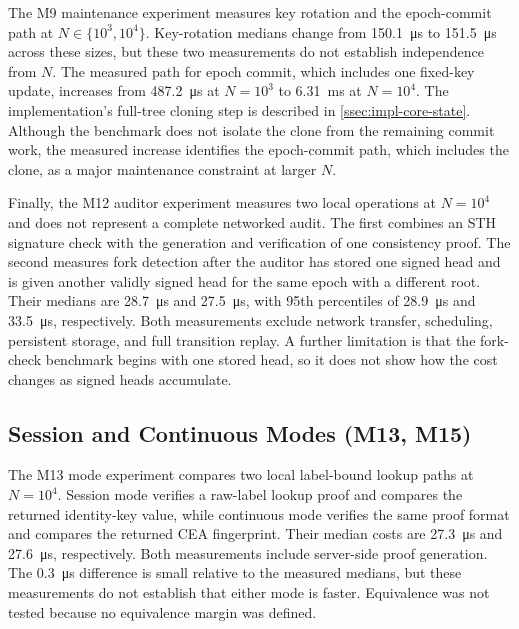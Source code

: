 The M9 maintenance experiment measures key rotation and the epoch-commit path at
$N\in\{10^3,10^4\}$. Key-rotation medians change from \SI{150.1}{\micro\second} to
\SI{151.5}{\micro\second} across these sizes, but these two measurements do not establish
independence from $N$. The measured path for epoch commit, which includes one fixed-key update,
increases from \SI{487.2}{\micro\second} at $N=10^3$ to \SI{6.31}{\milli\second} at $N=10^4$.
The implementation's full-tree cloning step is described in \cref{ssec:impl-core-state}. Although
the benchmark does not isolate the clone from the remaining commit work, the measured increase
identifies the epoch-commit path, which includes the clone, as a major maintenance constraint
at larger $N$.

Finally, the M12 auditor experiment measures two local operations at $N=10^4$ and does not
represent a complete networked audit. The first combines an STH signature check with the generation
and verification of one consistency proof. The second measures fork detection after the auditor has
stored one signed head and is given another validly signed head for the same epoch with a different
root. Their medians are \SI{28.7}{\micro\second} and \SI{27.5}{\micro\second}, with 95th
percentiles of \SI{28.9}{\micro\second} and \SI{33.5}{\micro\second}, respectively. Both
measurements exclude network transfer, scheduling, persistent storage, and full transition replay.
A further limitation is that the fork-check benchmark begins with one stored head, so it does not
show how the cost changes as signed heads accumulate.

\subsection{Session and Continuous Modes (M13, M15)}\label{ssec:eval-modes}

The M13 mode experiment compares two local label-bound lookup paths at $N=10^4$. Session mode
verifies a raw-label lookup proof and compares the returned identity-key value, while continuous
mode verifies the same proof format and compares the returned CEA fingerprint. Their median costs
are \SI{27.3}{\micro\second} and \SI{27.6}{\micro\second}, respectively. Both measurements
include server-side proof generation. The \SI{0.3}{\micro\second} difference is small relative to the
measured medians, but these measurements do not establish that either mode is faster.
Equivalence was not tested because no equivalence margin was defined.

